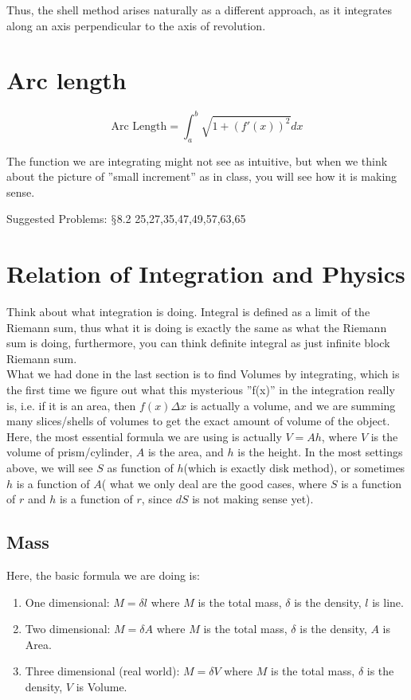 \documentclass[12pt]{article}
\theoremstyle{definition}
\theoremstyle{definition}
\theoremstyle{remark}
\theoremstyle{definition}
\theoremstyle{definition}
\theoremstyle{definition}
\begin{document}
Thus, the shell method arises naturally as a different approach, as it integrates along an axis perpendicular to the axis of revolution.

\section{Arc length}

\[\text{Arc Length}=\int^b_a\sqrt{1+(f'(x))^2}dx\]

The function we are integrating might not see as intuitive, but when we think about the picture of ''small increment'' as in class, you will see how it is making sense.

Suggested Problems: $\mathsection$8.2 25,27,35,47,49,57,63,65


\section{Relation of Integration and Physics}

Think about what integration is doing. Integral is defined as a limit of the Riemann sum, thus what it is doing is exactly the same as what the Riemann sum is doing, furthermore, you can think definite integral as just infinite block Riemann sum.\\
What we had done in the last section is to find Volumes by integrating, which is the first time we figure out what this mysterious ''f(x)'' in the integration really is, i.e. if it is an area, then $f(x)\Delta x$ is actually a volume, and we are summing many slices/shells of volumes to get the exact amount of volume of the object.\\
Here, the most essential formula we are using is actually $V=Ah$, where $V$ is the volume of prism/cylinder, $A$ is the area, and $h$ is the height. In the most settings above, we will see $S$ as function of $h$(which is exactly disk method), or sometimes $h$ is a function of $A$( what we only deal are the good cases, where $S$ is a function of $r$ and $h$ is a function of  $r$, since $dS$ is not making sense yet).

\subsection{Mass}


Here, the basic formula we are doing is:\begin{enumerate}
\item One dimensional: $M=\delta l$ where $M$ is the total mass, $\delta$ is the density, $l$ is line.
\item
Two dimensional: $M=\delta A$ where $M$ is the total mass, $\delta$ is the density, $A$ is Area.
\item Three dimensional (real world): $M=\delta V$ where $M$ is the total mass, $\delta$ is the density, $V$ is Volume.
\end{enumerate}
\end{document}
